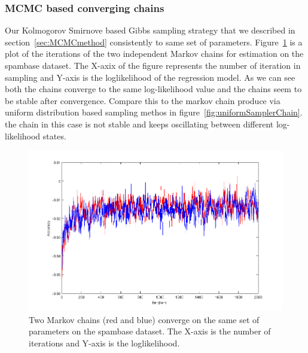 \subsubsection{MCMC based converging chains}
Our Kolmogorov Smirnove based Gibbs sampling strategy that we described in
section~\ref{sec:MCMCmethod} consistently to same set of parameters.
Figure~\ref{fig:MCMCconverge} is a plot of the iterations of the two
independent Markov chains for estimation on the spambase dataset. 
The X-axix of the figure represents the number of
iteration in sampling and Y-axis is the loglikelihood of the regression model.
As we can see both the chains converge to the same log-likelihood value and the
chains seem to be stable after convergence. Compare this to the markov chain
produce via uniform distribution based sampling methos in
figure~\ref{fig:uniformSamplerChain}. the chain in this case is not stable and
keeps oscillating between different log-likelihood states. 
 

\begin{figure}[hbt]
\includegraphics[width=1\textwidth]{results/KSsampleChain.png}
\caption{Two Markov chains (red and blue) converge on the same set of
parameters on the spambase dataset. The
X-axis is the number of iterations and Y-axis is the loglikelihood.}
\label{fig:MCMCconverge}
\end{figure}
